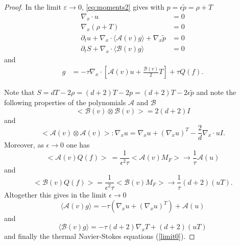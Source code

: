 \documentclass[final,11pt]{siamart251216}
\newcommand{\A}{\mathcal{A}}
\newcommand{\B}{\mathcal{B}}
\numberwithin{equation}{section}
\theoremstyle{definition}
\theoremstyle{remark}
\begin{document}
\begin{proof}
In the limit $\varepsilon \rightarrow 0$, \eqref{eq:moments2} gives with $p = \epsilon \tilde p = \rho +T $
\begin{align*}
  \nabla_x \cdot u &= 0 \nonumber \\
  \nabla_x(\rho +T)&= 0 \nonumber \\
  \partial_t u + \nabla_x \cdot \langle \mathcal{A}(v) g \rangle + \nabla_x \tilde p &= 0\nonumber \label{eq:moments3} \\
\partial_t S  +\nabla_x \cdot \langle \mathcal{B}(v) g \rangle &= 0
\end{align*}
and
\begin{align*}
g&= - \tau  \nabla_x \cdot \left[ \mathcal{A}(v) u + \frac{\mathcal{B}(v)}{2} T \right]  + \tau Q(f).
\end{align*}

Note that  $S=dT-2 \rho = (d+2) T -2 p =(d+2) T -2 \epsilon \tilde p $
and note the following properties of the polynomials $\A$ and $\B$
 $$
< \B(v) \otimes \B(v) > = 2 (d+2) I 
$$
and
$$
<\A(v) \otimes \A(v) >  : \nabla_x u  = \nabla_x u +(\nabla_x u )^T  -  \frac{2}{d} \nabla_x \cdot  u I.
$$
Moreover, as $\epsilon \rightarrow 0$ one has 
$$
<\mathcal{A}(v) Q (f)>\  = \frac{1}{\epsilon^2 \tau }<\mathcal{A}(v) M_F> \rightarrow   \frac{1}{\tau} \mathcal{A}(u)
$$
and 
$$
<\mathcal{B}(v) Q (f)>  =\frac{1}{\epsilon^2 \tau }<\mathcal{B}(v) M_F>    \rightarrow  \frac{1}{\tau} (d+2) (u T).
$$
Altogether this gives in the limit $\epsilon \rightarrow 0$
\[
\langle \mathcal{A}(v) g\rangle  = - \tau (\nabla_x u + (\nabla_x u)^T) + \mathcal{A} (u) 
\]
and
\[
\langle \mathcal{B}(v) g\rangle  = - \tau (d+2) \nabla_x T + (d+2)(uT)
\]
and finally the thermal Navier-Stokes equations (\ref{limit0}).
\end{proof}
\end{document}
